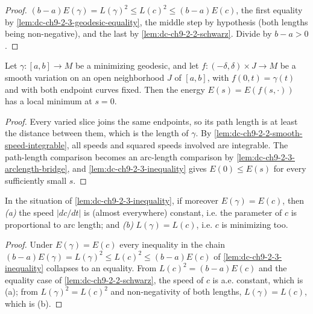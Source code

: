 \begin{proof}

  \sketch
  $(b-a)E(\gamma)=L(\gamma)^2\le L(c)^2\le (b-a)E(c)$, the first equality by
  \cref{lem:dc-ch9-2-3-geodesic-equality}, the middle step by hypothesis (both lengths being
  non-negative), and the last by \cref{lem:dc-ch9-2-2-schwarz}. Divide by $b-a>0$.

\end{proof}
\begin{lemma}
  \label{lem:dc-ch9-2-3-smooth-variation-energy-min}


  Let $\gamma:[a,b]\to M$ be a minimizing geodesic, and let
  $f:(-\delta,\delta)\times J\to M$ be a smooth variation on an open
  neighborhood $J$ of $[a,b]$, with $f(0,t)=\gamma(t)$ and with both endpoint
  curves fixed. Then the energy $E(s)=E(f(s,\cdot))$ has a local minimum at
  $s=0$.
\end{lemma}
\begin{proof}

  \sketch
  Every varied slice joins the same endpoints, so its path length is at least
  the distance between them, which is the length of $\gamma$. By
  \cref{lem:dc-ch9-2-2-smooth-speed-integrable}, all speeds and squared speeds
  involved are integrable. The path-length comparison becomes an arc-length
  comparison by \cref{lem:dc-ch9-2-3-arclength-bridge}, and
  \cref{lem:dc-ch9-2-3-inequality} gives $E(0)\le E(s)$ for every sufficiently
  small $s$.
\end{proof}
\begin{lemma}
  \label{lem:dc-ch9-2-3-equality-case}


  In the situation of \cref{lem:dc-ch9-2-3-inequality}, if moreover $E(\gamma)=E(c)$, then
  \emph{(a)} the speed $|dc/dt|$ is (almost everywhere) constant, i.e. the parameter of $c$
  is proportional to arc length; and \emph{(b)} $L(\gamma)=L(c)$, i.e. $c$ is minimizing too.

\end{lemma}
\begin{proof}

  \sketch
  Under $E(\gamma)=E(c)$ every inequality in the chain
  $(b-a)E(\gamma)=L(\gamma)^2\le L(c)^2\le (b-a)E(c)$ of
  \cref{lem:dc-ch9-2-3-inequality} collapses to an equality. From $L(c)^2=(b-a)E(c)$ and the
  equality case of \cref{lem:dc-ch9-2-2-schwarz}, the speed of $c$ is a.e. constant, which is
  (a); from $L(\gamma)^2=L(c)^2$ and non-negativity of both lengths, $L(\gamma)=L(c)$, which
  is (b).
\end{proof}
